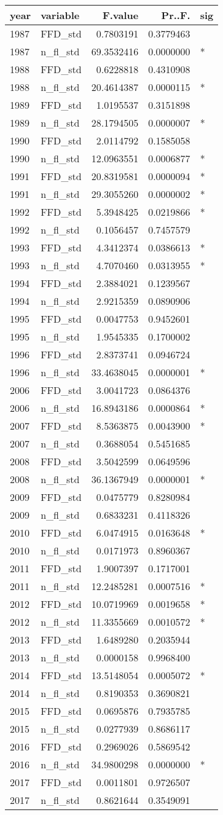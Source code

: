 \documentclass[]{article}
\begin{document}
\begin{longtable}[]{@{}llrrl@{}}
\toprule
year & variable & F.value & Pr..F. & sig\tabularnewline
\midrule
\endhead
1987 & FFD\_std & 0.7803191 & 0.3779463 &\tabularnewline
1987 & n\_fl\_std & 69.3532416 & 0.0000000 & *\tabularnewline
1988 & FFD\_std & 0.6228818 & 0.4310908 &\tabularnewline
1988 & n\_fl\_std & 20.4614387 & 0.0000115 & *\tabularnewline
1989 & FFD\_std & 1.0195537 & 0.3151898 &\tabularnewline
1989 & n\_fl\_std & 28.1794505 & 0.0000007 & *\tabularnewline
1990 & FFD\_std & 2.0114792 & 0.1585058 &\tabularnewline
1990 & n\_fl\_std & 12.0963551 & 0.0006877 & *\tabularnewline
1991 & FFD\_std & 20.8319581 & 0.0000094 & *\tabularnewline
1991 & n\_fl\_std & 29.3055260 & 0.0000002 & *\tabularnewline
1992 & FFD\_std & 5.3948425 & 0.0219866 & *\tabularnewline
1992 & n\_fl\_std & 0.1056457 & 0.7457579 &\tabularnewline
1993 & FFD\_std & 4.3412374 & 0.0386613 & *\tabularnewline
1993 & n\_fl\_std & 4.7070460 & 0.0313955 & *\tabularnewline
1994 & FFD\_std & 2.3884021 & 0.1239567 &\tabularnewline
1994 & n\_fl\_std & 2.9215359 & 0.0890906 &\tabularnewline
1995 & FFD\_std & 0.0047753 & 0.9452601 &\tabularnewline
1995 & n\_fl\_std & 1.9545335 & 0.1700002 &\tabularnewline
1996 & FFD\_std & 2.8373741 & 0.0946724 &\tabularnewline
1996 & n\_fl\_std & 33.4638045 & 0.0000001 & *\tabularnewline
2006 & FFD\_std & 3.0041723 & 0.0864376 &\tabularnewline
2006 & n\_fl\_std & 16.8943186 & 0.0000864 & *\tabularnewline
2007 & FFD\_std & 8.5363875 & 0.0043900 & *\tabularnewline
2007 & n\_fl\_std & 0.3688054 & 0.5451685 &\tabularnewline
2008 & FFD\_std & 3.5042599 & 0.0649596 &\tabularnewline
2008 & n\_fl\_std & 36.1367949 & 0.0000001 & *\tabularnewline
2009 & FFD\_std & 0.0475779 & 0.8280984 &\tabularnewline
2009 & n\_fl\_std & 0.6833231 & 0.4118326 &\tabularnewline
2010 & FFD\_std & 6.0474915 & 0.0163648 & *\tabularnewline
2010 & n\_fl\_std & 0.0171973 & 0.8960367 &\tabularnewline
2011 & FFD\_std & 1.9007397 & 0.1717001 &\tabularnewline
2011 & n\_fl\_std & 12.2485281 & 0.0007516 & *\tabularnewline
2012 & FFD\_std & 10.0719969 & 0.0019658 & *\tabularnewline
2012 & n\_fl\_std & 11.3355669 & 0.0010572 & *\tabularnewline
2013 & FFD\_std & 1.6489280 & 0.2035944 &\tabularnewline
2013 & n\_fl\_std & 0.0000158 & 0.9968400 &\tabularnewline
2014 & FFD\_std & 13.5148054 & 0.0005072 & *\tabularnewline
2014 & n\_fl\_std & 0.8190353 & 0.3690821 &\tabularnewline
2015 & FFD\_std & 0.0695876 & 0.7935785 &\tabularnewline
2015 & n\_fl\_std & 0.0277939 & 0.8686117 &\tabularnewline
2016 & FFD\_std & 0.2969026 & 0.5869542 &\tabularnewline
2016 & n\_fl\_std & 34.9800298 & 0.0000000 & *\tabularnewline
2017 & FFD\_std & 0.0011801 & 0.9726507 &\tabularnewline
2017 & n\_fl\_std & 0.8621644 & 0.3549091 &\tabularnewline
\bottomrule
\end{longtable}
\end{document}
